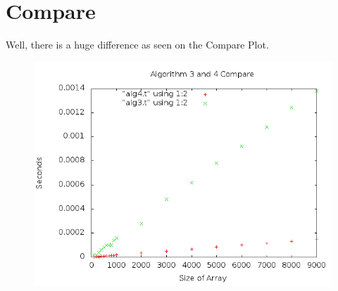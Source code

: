 \documentclass[a4paper,10pt]{article}
\begin{document}
	\section{Compare}
		Well, there is a huge difference as seen on the Compare Plot.
		\begin{figure}[!htb]
			\centering
			\includegraphics[scale=.5]{timingfiles/algCompareplot.png}
		\end{figure}

		
		
\end{document}

